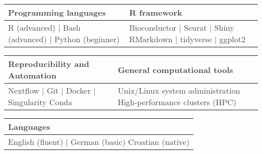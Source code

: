 \documentclass[11pt,a4paper,]{awesome-cv}
\begin{document}
\begin{table}[H]
\centering\begingroup\fontsize{11}{13}\selectfont

\begin{tabular}{>{\centering\arraybackslash}p{6.5cm}>{\centering\arraybackslash}p{6.5cm}}
\toprule
\textcolor[HTML]{464646}{\textbf{Programming languages}} & \textcolor[HTML]{464646}{\textbf{R framework}}\\
\midrule
\textcolor[HTML]{464646}{R (advanced) | Bash (advanced) | Python (beginner)} & \textcolor[HTML]{464646}{Bioconductor | Seurat | Shiny   RMarkdown | tidyverse | ggplot2}\\
\bottomrule
\end{tabular}
\endgroup{}
\end{table}

\begin{table}[H]
\centering\begingroup\fontsize{11}{13}\selectfont

\begin{tabular}{>{\centering\arraybackslash}p{6.5cm}>{\centering\arraybackslash}p{6.5cm}}
\toprule
\textcolor[HTML]{464646}{\textbf{Reproducibility and Automation}} & \textcolor[HTML]{464646}{\textbf{General computational tools}}\\
\midrule
\textcolor[HTML]{464646}{Nextflow | Git | Docker | Singularity   Conda} & \textcolor[HTML]{464646}{Unix/Linux system administration   High-performance clusters (HPC)}\\
\bottomrule
\end{tabular}
\endgroup{}
\end{table}

\begin{cventries}
\end{cventries}\begin{table}[H]
\centering\begingroup\fontsize{11}{13}\selectfont

\begin{tabular}{>{\centering\arraybackslash}p{6.5cm}}
\toprule
\textcolor[HTML]{464646}{\textbf{Languages}}\\
\midrule
\textcolor[HTML]{464646}{English (fluent) | German (basic)   Croatian (native)}\\
\bottomrule
\end{tabular}
\endgroup{}
\end{table}
\end{document}
